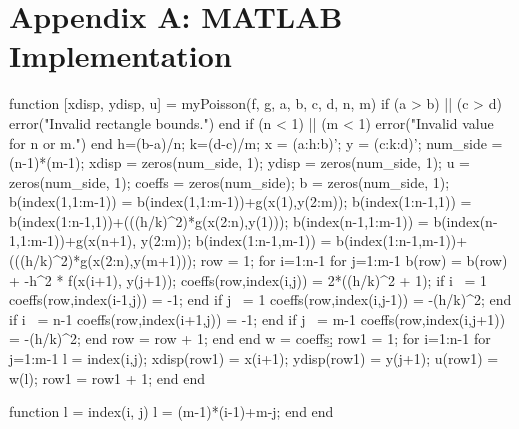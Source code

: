 \documentclass[12pt, titlepage]{article}
\begin{document}
    \section*{Appendix A\@: MATLAB Implementation}
    {\singlespacing
        \begin{code}
function [xdisp, ydisp, u] = myPoisson(f, g, a, b, c, d, n, m)
    if (a > b) || (c > d)
        error("Invalid rectangle bounds.")
    end
    if (n < 1) || (m < 1)
        error("Invalid value for n or m.")
    end
    h=(b-a)/n; k=(d-c)/m;
    x = (a:h:b)'; y = (c:k:d)';
    num_side = (n-1)*(m-1);
    xdisp = zeros(num_side, 1);
    ydisp = zeros(num_side, 1);
    u = zeros(num_side, 1);
    coeffs = zeros(num_side);
    b = zeros(num_side, 1);
    b(index(1,1:m-1)) = b(index(1,1:m-1))+g(x(1),y(2:m));
    b(index(1:n-1,1)) = b(index(1:n-1,1))+(((h/k)^2)*g(x(2:n),y(1)));
    b(index(n-1,1:m-1)) = b(index(n-1,1:m-1))+g(x(n+1), y(2:m));
    b(index(1:n-1,m-1)) = b(index(1:n-1,m-1))+(((h/k)^2)*g(x(2:n),y(m+1)));
    row = 1;
    for i=1:n-1
        for j=1:m-1
            b(row) = b(row) + -h^2 * f(x(i+1), y(j+1));
            coeffs(row,index(i,j)) = 2*((h/k)^2 + 1);
            if i ~= 1
                coeffs(row,index(i-1,j)) = -1;
            end
            if j ~= 1
                coeffs(row,index(i,j-1)) = -(h/k)^2;
            end
            if i ~= n-1
                coeffs(row,index(i+1,j)) = -1;
            end
            if j ~= m-1
                coeffs(row,index(i,j+1)) = -(h/k)^2;
            end
            row = row + 1;
        end
    end
    w = coeffs\b;
    row1 = 1;
    for i=1:n-1
        for j=1:m-1
            l = index(i,j);
            xdisp(row1) = x(i+1);
            ydisp(row1) = y(j+1);
            u(row1) = w(l);
            row1 = row1 + 1;
        end
    end

    function l = index(i, j)
        l = (m-1)*(i-1)+m-j;
    end
end
        \end{code}
    }
    \newpage 
    
    {}
\end{document}
